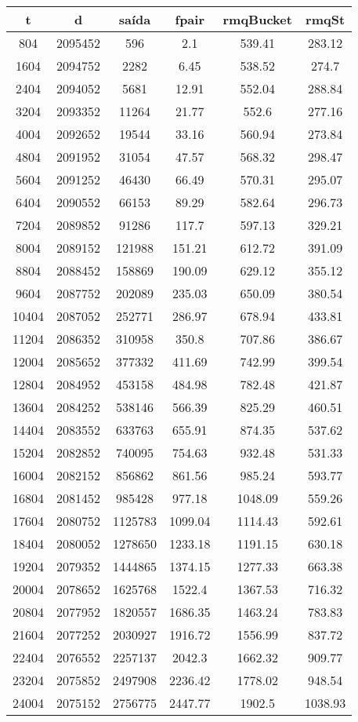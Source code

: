 \begin{tabular}{|c|c|c|c|c|c|}
\hline
\textbf{t} & \textbf{d} & \textbf{saída} & \textbf{fpair} & \textbf{rmqBucket} & \textbf{rmqSt}\\
\hline
804 & 2095452 & 596 & 2.1 & 539.41 & 283.12\\
\hline
1604 & 2094752 & 2282 & 6.45 & 538.52 & 274.7\\
\hline
2404 & 2094052 & 5681 & 12.91 & 552.04 & 288.84\\
\hline
3204 & 2093352 & 11264 & 21.77 & 552.6 & 277.16\\
\hline
4004 & 2092652 & 19544 & 33.16 & 560.94 & 273.84\\
\hline
4804 & 2091952 & 31054 & 47.57 & 568.32 & 298.47\\
\hline
5604 & 2091252 & 46430 & 66.49 & 570.31 & 295.07\\
\hline
6404 & 2090552 & 66153 & 89.29 & 582.64 & 296.73\\
\hline
7204 & 2089852 & 91286 & 117.7 & 597.13 & 329.21\\
\hline
8004 & 2089152 & 121988 & 151.21 & 612.72 & 391.09\\
\hline
8804 & 2088452 & 158869 & 190.09 & 629.12 & 355.12\\
\hline
9604 & 2087752 & 202089 & 235.03 & 650.09 & 380.54\\
\hline
10404 & 2087052 & 252771 & 286.97 & 678.94 & 433.81\\
\hline
11204 & 2086352 & 310958 & 350.8 & 707.86 & 386.67\\
\hline
12004 & 2085652 & 377332 & 411.69 & 742.99 & 399.54\\
\hline
12804 & 2084952 & 453158 & 484.98 & 782.48 & 421.87\\
\hline
13604 & 2084252 & 538146 & 566.39 & 825.29 & 460.51\\
\hline
14404 & 2083552 & 633763 & 655.91 & 874.35 & 537.62\\
\hline
15204 & 2082852 & 740095 & 754.63 & 932.48 & 531.33\\
\hline
16004 & 2082152 & 856862 & 861.56 & 985.24 & 593.77\\
\hline
16804 & 2081452 & 985428 & 977.18 & 1048.09 & 559.26\\
\hline
17604 & 2080752 & 1125783 & 1099.04 & 1114.43 & 592.61\\
\hline
18404 & 2080052 & 1278650 & 1233.18 & 1191.15 & 630.18\\
\hline
19204 & 2079352 & 1444865 & 1374.15 & 1277.33 & 663.38\\
\hline
20004 & 2078652 & 1625768 & 1522.4 & 1367.53 & 716.32\\
\hline
20804 & 2077952 & 1820557 & 1686.35 & 1463.24 & 783.83\\
\hline
21604 & 2077252 & 2030927 & 1916.72 & 1556.99 & 837.72\\
\hline
22404 & 2076552 & 2257137 & 2042.3 & 1662.32 & 909.77\\
\hline
23204 & 2075852 & 2497908 & 2236.42 & 1778.02 & 948.54\\
\hline
24004 & 2075152 & 2756775 & 2447.77 & 1902.5 & 1038.93\\
\hline
\end{tabular}
